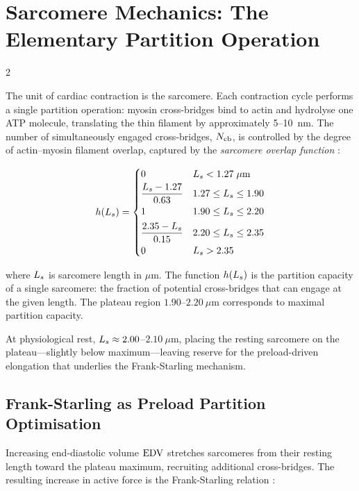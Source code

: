 \section{Sarcomere Mechanics: The Elementary Partition Operation}
\label{sec:ch09-sarcomere}

\begin{multicols}{2}

The unit of cardiac contraction is the sarcomere. Each contraction
cycle performs a single partition operation: myosin cross-bridges bind
to actin and hydrolyse one ATP molecule, translating the thin filament
by approximately 5--10~nm. The number of simultaneously engaged
cross-bridges, $N_{\mathrm{cb}}$, is controlled by the degree of actin--myosin
filament overlap, captured by the \emph{sarcomere overlap function}
\citep{gordon1966variation}:

\begin{equation}
h(L_s) = \begin{cases}
0 & L_s < 1.27\;\mu\mathrm{m} \\[2pt]
\dfrac{L_s - 1.27}{0.63} & 1.27 \le L_s \le 1.90 \\[4pt]
1 & 1.90 \le L_s \le 2.20 \\[4pt]
\dfrac{2.35 - L_s}{0.15} & 2.20 \le L_s \le 2.35 \\[4pt]
0 & L_s > 2.35
\end{cases}
\label{eq:ch09-sarcomere}
\end{equation}

where $L_s$ is sarcomere length in $\mu$m. The function $h(L_s)$
is the partition capacity of a single sarcomere: the fraction of
potential cross-bridges that can engage at the given length.
The plateau region $1.90$--$2.20~\mu\mathrm{m}$ corresponds to
maximal partition capacity.

At physiological rest, $L_s \approx 2.00$--$2.10~\mu\mathrm{m}$,
placing the resting sarcomere on the plateau---slightly below
maximum---leaving reserve for the preload-driven elongation that
underlies the Frank-Starling mechanism.

\columnbreak

\subsection{Frank-Starling as Preload Partition Optimisation}

Increasing end-diastolic volume $\mathrm{EDV}$ stretches sarcomeres from their
resting length toward the plateau maximum, recruiting additional
cross-bridges. The resulting increase in active force is the
Frank-Starling relation \citep{frank1895dynamics,starling1918law}:


\end{multicols}
